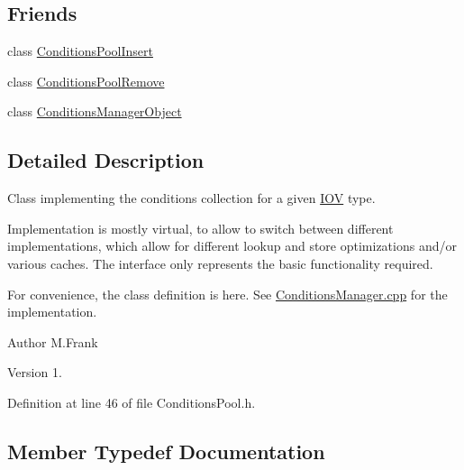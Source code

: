 \subsection*{Friends}
\begin{DoxyCompactItemize}
\item 
class \hyperlink{class_d_d4hep_1_1_conditions_1_1_conditions_pool_adc5b872586a9fed84b7604b98cb7bd58}{Conditions\+Pool\+Insert}
\item 
class \hyperlink{class_d_d4hep_1_1_conditions_1_1_conditions_pool_a3b722c844edb9493ba7339da2813026b}{Conditions\+Pool\+Remove}
\item 
class \hyperlink{class_d_d4hep_1_1_conditions_1_1_conditions_pool_a8bc615a0a23a8207d3e5399c5066763e}{Conditions\+Manager\+Object}
\end{DoxyCompactItemize}


\subsection{Detailed Description}
Class implementing the conditions collection for a given \hyperlink{class_d_d4hep_1_1_i_o_v}{I\+OV} type. 

Implementation is mostly virtual, to allow to switch between different implementations, which allow for different lookup and store optimizations and/or various caches. The interface only represents the basic functionality required.

For convenience, the class definition is here. See \hyperlink{_conditions_manager_8cpp}{Conditions\+Manager.\+cpp} for the implementation.

\begin{DoxyAuthor}{Author}
M.\+Frank 
\end{DoxyAuthor}
\begin{DoxyVersion}{Version}
1. 
\end{DoxyVersion}


Definition at line 46 of file Conditions\+Pool.\+h.



\subsection{Member Typedef Documentation}
\hypertarget{class_d_d4hep_1_1_conditions_1_1_conditions_pool_af0032de2b90b6bab00bf857f6078daaf}{}\label{class_d_d4hep_1_1_conditions_1_1_conditions_pool_af0032de2b90b6bab00bf857f6078daaf} 
